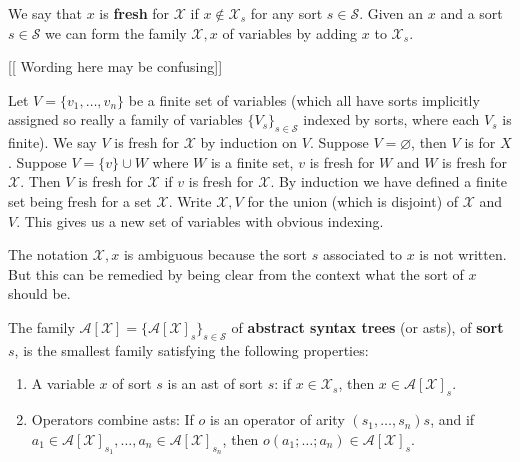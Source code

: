 \begin{defin}
    We say that $x$ is \textbf{fresh} for $\mathcal{X}$ if $x \not\in \mathcal{X}_s$ for any sort $s\in \mathcal{S}$. Given an $x$ and a sort $s\in \mathcal{S}$ we can form the family $\mathcal{X},x$ of variables by adding $x$ to $\mathcal{X}_s$. 
\end{defin}


[[ Wording here may be confusing]]
\begin{defin}
    Let $V=\{ v_1 ,\dots, v_n\}$ be a finite set of variables (which all have sorts implicitly assigned so really a family of variables $\{V_s\}_{s\in\mathcal{S}}$ indexed by sorts, where each $V_s$ is finite). We say $V$ is fresh for $\mathcal{X}$ by induction on $V$. Suppose $V=\varnothing$, then $V$ is  for $X$. Suppose $V = \{v \} \cup W$ where $W$ is a finite set, $v$ is fresh for $W$ and $W$ is fresh for $\mathcal{X}$. Then $V$ is fresh for $\mathcal{X}$ if $v$ is fresh for $\mathcal{X}$. By induction we have defined a finite set being fresh for a set $\mathcal{X}$. Write $\mathcal{X},V$ for the union (which is disjoint) of $\mathcal{X}$ and $V$. This gives us a new set of variables with obvious indexing.
\end{defin}

\begin{remark}
    The notation $\mathcal{X},x$ is ambiguous because the sort $s$ associated to $x$ is not written. But this can be remedied by being clear from the context what the sort of $x$ should be.
\end{remark}

\begin{defin}
    The family $\mathcal{A}[\mathcal{X}]=\{ \mathcal{A}[\mathcal{X}]_s \}_{s \in \mathcal{S}}$ of \textbf{abstract syntax trees} (or asts), of \textbf{sort} $s$, is the smallest family satisfying the following properties:
    
    \begin{enumerate}
        \item A variable $x$ of sort $s$ is an ast of sort $s$: if $x \in \mathcal{X}_s$, then $x \in \mathcal{A}[\mathcal{X}]_s$.
        
        \item Operators combine asts: If $o$ is an operator of arity $(s_1, \dots, s_n)s$, and if $a_1 \in \mathcal{A}[\mathcal{X}]_{s_1}, \dots, a_n \in \mathcal{A}[\mathcal{X}]_{s_n}$, then $o(a_1;\dots; a_n) \in \mathcal{A}[\mathcal{X}]_s$.
    \end{enumerate}
\end{defin}

